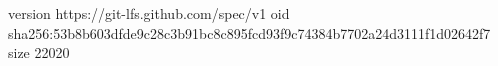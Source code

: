 version https://git-lfs.github.com/spec/v1
oid sha256:53b8b603dfde9c28c3b91bc8c895fcd93f9c74384b7702a24d3111f1d02642f7
size 22020
